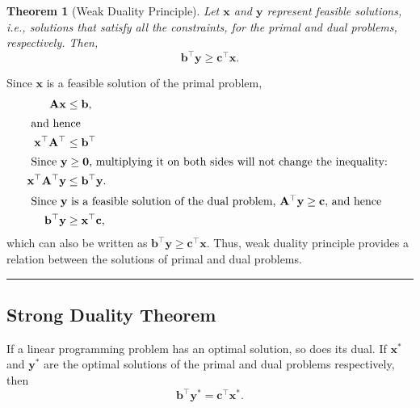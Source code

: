 \documentclass[twoside]{article}
\newcounter{lecnum}
\newtheorem{theorem}{Theorem}[lecnum]
\newenvironment{proof}{{\textit{Proof.}}}{\hfill\rule{2mm}{2mm}}
\begin{document}
\begin{theorem}[Weak Duality Principle]
    Let $\mathbf{x}$ and $\mathbf{y}$ represent feasible solutions, i.e., solutions
    that satisfy all the constraints, for the primal and dual problems,
    respectively. Then, \[
        \mathbf{b}^\top \mathbf{y} \ge \mathbf{c}^\top \mathbf{x}.
    \]
\end{theorem}
\begin{proof}
    Since $\mathbf{x}$ is a feasible solution of the primal problem,
    \begin{align*}
        \mathbf{Ax} &\leq \mathbf{b}, \\
        \intertext{
            and hence
        }
        \mathbf{x}^\top \mathbf{A}^\top &\leq \mathbf{b}^\top \\
        \intertext{
            Since $\mathbf{y} \geq \mathbf{0}$, multiplying it on both sides
            will not change the inequality:
        }
        \mathbf{x}^\top \mathbf{A}^\top \mathbf{y}
            &\leq \mathbf{b}^\top \mathbf{y}. \\
        \intertext{
            Since $\mathbf{y}$ is a feasible solution of the dual problem,
            $\mathbf{A}^\top \mathbf{y} \geq \mathbf{c},$ and hence
        }
        \mathbf{b}^\top \mathbf{y} &\geq \mathbf{x}^\top \mathbf{c},
    \end{align*}
    which can also be written as $\mathbf{b}^\top \mathbf{y} \geq
    \mathbf{c}^\top \mathbf{x}$.
    Thus, weak duality principle provides a relation between the
    solutions of primal and dual problems.
\end{proof}

\subsection{Strong Duality Theorem}
If a linear programming problem has an optimal solution, so does its dual. If
$\mathbf{x^*}$ and $\mathbf{y^*}$ are the optimal solutions of the primal and
dual problems respectively, then \[
    \mathbf{b}^\top \mathbf{y}^* = \mathbf{c}^\top \mathbf{x}^*.
\]
\end{document}
